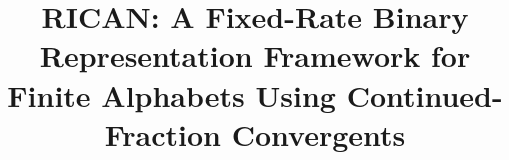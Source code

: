 \documentclass[onecolumn]{IEEEtran}
\begin{document}

\title{
RICAN: A Fixed-Rate Binary Representation Framework for
Finite Alphabets Using Continued-Fraction Convergents
}

\author{
}

\maketitle

\end{document}
